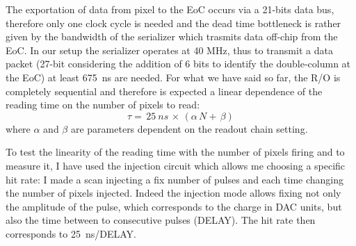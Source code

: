         The exportation of data from pixel to the EoC occurs via a 21-bits data bus, therefore only one clock cycle is needed and the dead time bottleneck is rather given by the bandwidth of the serializer which trasmits data off-chip from the EoC. In our setup the serializer operates at 40 MHz, thus to transmit a data packet (27-bit considering the addition of 6 bits to identify the double-column at the EoC) at least \SI{675}{ns} are needed. 
        For what we have said so far, the R/O is completely sequential and therefore is expected a linear dependence of the reading time on the number of pixels to read:
        \begin{equation}
            \tau =\, 25\: \unit{ns}\, \times\, (\alpha\, N +\, \beta)
            \label{eq:reading_time}
        \end{equation}
        where $\alpha$ and $\beta$ are parameters dependent on the readout chain setting. 
        
        To test the linearity of the reading time with the number of pixels firing and to measure it, I have used the injection circuit which allows me choosing a specific hit rate: I made a scan injecting a fix number of pulses and each time changing the number of pixels injected.
        Indeed the injection mode allows fixing not only the amplitude of the pulse, which corresponds to the charge in DAC units, but also the time between to consecutive pulses (DELAY). The hit rate then corresponds to \SI{25}{ns}/DELAY.


